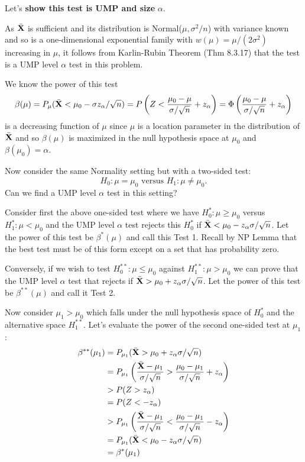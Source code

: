 \documentclass[11pt,]{article}
\def\bX{{\bf X}}
\def\bXbar{\bar{ \bX}}
\begin{document}
Let's \textbf{show this test is UMP and size } \(\alpha\).

As \(\bXbar\) is sufficient and its distribution is
Normal(\(\mu, \sigma^2/n\)) with variance known and so is a
one-dimensional exponential family with \(w(\mu) = \mu/(2\sigma^2)\)
increasing in \(\mu\), it follows from Karlin-Rubin Theorem (Thm 8.3.17)
that the test is a UMP level \(\alpha\) test in this problem.

We know the power of this test
\[\beta(\mu) = P_{\mu}(\bXbar < \mu_0 - \sigma z_\alpha/\sqrt{n}) = 
P\left(Z < \frac{\mu_0 - \mu}{\sigma/\sqrt{n}}+ z_\alpha\right) = \Phi\left(\frac{\mu_0 - \mu}{\sigma/\sqrt{n}}+ z_\alpha\right)\]
is a decreasing function of \(\mu\) since \(\mu\) is a location
parameter in the distribution of \(\bXbar\) and so \(\beta(\mu)\) is
maximized in the null hypothesis space at \(\mu_0\) and
\(\beta(\mu_0) = \alpha\).

 Now
consider the same Normality setting but with a two-sided test:
\[H_0: \mu = \mu_0 \mbox{ versus } H_1: \mu\neq\mu_0.\] Can we find a
UMP level \(\alpha\) test in this setting?

Consider first the above one-sided test where we have
\(H^*_0: \mu \geq \mu_0\) versus \(H^*_1: \mu < \mu_0\) and the UMP
level \(\alpha\) test rejects this \(H^*_0\) if
\(\bXbar < \mu_0 - z_\alpha \sigma/\sqrt{n}\). Let the power of this
test be \(\beta^*(\mu)\) and call this Test 1. Recall by NP Lemma that
the best test must be of this form except on a set that has probability
zero.

Conversely, if we wish to test \(H^{**}_0: \mu \leq \mu_0\) against
\(H^{**}_1: \mu > \mu_0\) we can prove that the UMP level \(\alpha\)
test that rejects if \(\bXbar > \mu_0 + z_\alpha \sigma/\sqrt{n}\). Let
the power of this test be \(\beta^{**}(\mu)\) and call it Test 2.

Now consider \(\mu_1 > \mu_0\) which falls under the null hypothesis
space of \(H^*_0\) and the alternative space \(H^{**}_1\). Let's
evaluate the power of the second one-sided test at \(\mu_1\):
\begin{align*}
\beta^{**}(\mu_1) &= P_{\mu_1} (\bXbar > \mu_0 + z_\alpha \sigma/\sqrt{n})\\
&= P_{\mu_1} \left(\frac{\bXbar - \mu_1}{\sigma/\sqrt{n}} > \frac{\mu_0 - \mu_1}{\sigma/\sqrt{n}}+ z_\alpha\right)\\
&> P(Z > z_\alpha)\\
&= P(Z < -z_\alpha)\\
&> P_{\mu_1} \left(\frac{\bXbar - \mu_1}{\sigma/\sqrt{n}} < \frac{\mu_0 - \mu_1}{\sigma/\sqrt{n}}- z_\alpha\right)\\
&= P_{\mu_1} (\bXbar < \mu_0 - z_\alpha \sigma/\sqrt{n})\\
&= \beta^{*}(\mu_1)
\end{align*}
\end{document}
